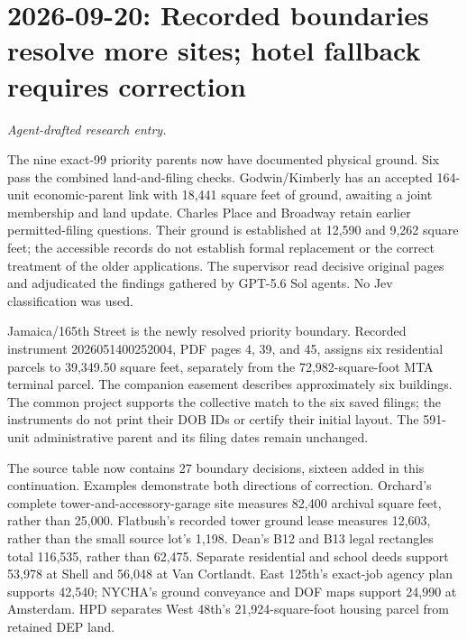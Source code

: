 \clearpage
\section*{2026-09-20: Recorded boundaries resolve more sites; hotel fallback requires correction}
\textit{Agent-drafted research entry.}

The nine exact-99 priority parents now have documented physical ground. Six
pass the combined land-and-filing checks. Godwin/Kimberly has an accepted
164-unit economic-parent link with 18,441 square feet of ground, awaiting a
joint membership and land update. Charles Place and Broadway retain earlier
permitted-filing questions. Their ground is established at 12,590 and 9,262
square feet; the accessible records do not establish formal replacement or
the correct treatment of the older applications. The supervisor read decisive
original pages and adjudicated the findings gathered by GPT-5.6 Sol agents.
No Jev classification was used.

Jamaica/165th Street is the newly resolved priority boundary. Recorded
instrument 2026051400252004, PDF pages 4, 39, and 45, assigns six residential
parcels to 39,349.50 square feet, separately from the 72,982-square-foot MTA
terminal parcel. The companion easement describes approximately six buildings.
The common project supports the collective match to the six saved filings;
the instruments do not print their DOB IDs or certify their initial layout.
The 591-unit administrative parent and its filing dates remain unchanged.

The source table now contains 27 boundary decisions, sixteen added in this
continuation. Examples demonstrate both directions of correction. Orchard's
complete tower-and-accessory-garage site measures 82,400 archival square feet,
rather than 25,000. Flatbush's recorded tower ground lease measures 12,603,
rather than the small source lot's 1,198. Dean's B12 and B13 legal rectangles
total 116,535, rather than 62,475. Separate residential and school deeds support
53,978 at Shell and 56,048 at Van Cortlandt. East 125th's exact-job agency plan
supports 42,540; NYCHA's ground conveyance and DOF maps support 24,990 at
Amsterdam. HPD separates West 48th's 21,924-square-foot housing parcel from
retained DEP land.

